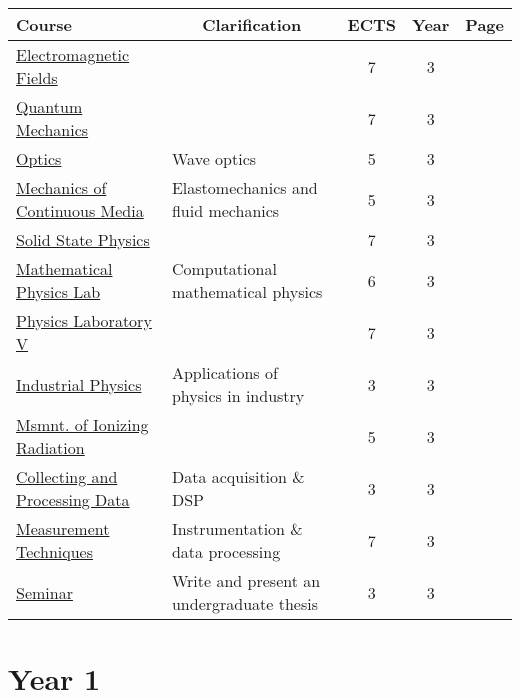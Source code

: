 \documentclass[11pt, a4paper]{article}
\begin{document}
\begin{adjustbox}{center}
\begin{tabular}{|l|l|c|c|c|}
    \textbf{Course} & \multicolumn{1}{c}{\textbf{Clarification}} & \textbf{ECTS} & \textbf{Year} & \textbf{Page}\\
    \hline
    \hline {\rule{0pt}{2.5ex}} \hspace{-7pt}
    \hyperref[electromagnetic_fields]{Electromagnetic Fields} & & 7 & 3 & \pageref{electromagnetic_fields} \\
    \hyperref[quantum_mechanics]{Quantum Mechanics} & & 7 & 3 & \pageref{quantum_mechanics} \\
    \hyperref[optics]{Optics} & Wave optics & 5 & 3 & \pageref{optics} \\
    \hyperref[mechanics_of_continuous_media]{Mechanics of Continuous Media} & Elastomechanics and fluid mechanics & 5 & 3 & \pageref{mechanics_of_continuous_media} \\
    \hyperref[solid_state_physics]{Solid State Physics} & & 7 & 3 & \pageref{solid_state_physics} \\
    \hyperref[mathematical_physics_lab]{Mathematical Physics Lab} & Computational mathematical physics & 6 & 3 & \pageref{mathematical_physics_lab} \\
    \hyperref[physics_laboratory_5]{Physics Laboratory V} & & 7 & 3 & \pageref{physics_laboratory_5} \\
    \hyperref[industrial_physics]{Industrial Physics} & Applications of physics in industry & 3 & 3 & \pageref{industrial_physics} \\
    \hyperref[measurement_of_ionizing_radiation]{Msmnt. of Ionizing Radiation} & & 5 & 3 & \pageref{measurement_of_ionizing_radiation} \\
    \hyperref[collecting_and_processing_data]{Collecting and Processing Data} & Data acquisition \& DSP & 3 & 3 & \pageref{collecting_and_processing_data} \\
    \hyperref[measurement_techniques]{Measurement Techniques} & Instrumentation \& data processing & 7 & 3 & \pageref{measurement_techniques} \\
    \hyperref[seminar]{Seminar} & Write and present an undergraduate thesis & 3 & 3 & \pageref{seminar} \\
    \hline
\end{tabular}
\end{adjustbox}


\newpage
\pagestyle{fancy}
\section{Year 1}
\end{document}
